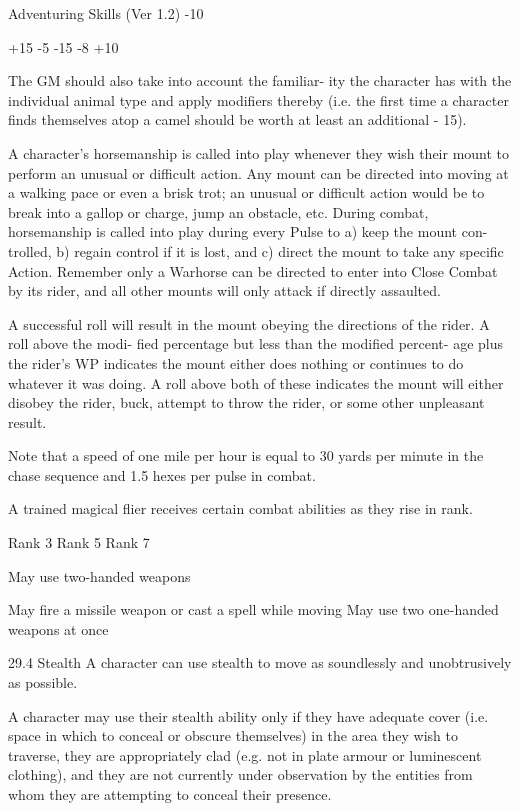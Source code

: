 \begin{Chapter}{Adventuring Skills (Ver 1.2)}
-10 

+15 
-5 
-15 
-8 
+10 
 

The GM should also take into account the familiar-
ity  the  character  has  with  the  individual  animal 
type and apply modifiers thereby (i.e. the first time 
a  character  finds  themselves  atop  a  camel  should 
be worth at least an additional - 15). 

A  character’s  horsemanship  is  called  into  play 
whenever  they  wish  their  mount  to  perform  an 
unusual  or  difficult  action.  Any  mount  can  be 
directed  into  moving  at  a  walking  pace  or  even  a 
brisk  trot;  an  unusual  or  difficult  action  would  be 
to break into a gallop or charge, jump an obstacle, 
etc.  During  combat,  horsemanship  is  called  into 
play during every Pulse to a) keep the mount con-
trolled,  b)  regain  control  if  it  is  lost,  and  c)  direct 
the  mount  to  take  any  specific  Action.  Remember 
only a Warhorse can be directed to enter into Close 
Combat by its rider, and all other mounts will only 
attack if directly assaulted. 

A  successful  roll  will  result  in  the  mount  obeying 
the  directions  of  the  rider.  A  roll  above  the  modi-
fied percentage but less than the modified percent-
age plus the rider’s WP indicates the mount either 
does  nothing  or  continues  to  do  whatever  it  was 
doing.  A  roll  above  both  of  these  indicates  the 
mount  will  either  disobey  the  rider,  buck,  attempt 
to throw the rider, or some other unpleasant result. 

Note  that a  speed  of  one  mile  per  hour  is  equal  to 
30 yards per minute in the chase sequence and 1.5 
hexes per pulse in combat. 

A  trained  magical  flier  receives  certain  combat 
abilities as they rise in rank. 

Rank 
3  
Rank 
5  
Rank 
7  

May use two-handed weapons 

May fire a missile weapon or cast a spell 
while moving 
May use two one-handed weapons at 
once 

29.4 Stealth 
A character can use stealth to move as soundlessly 
and unobtrusively as possible. 

A  character  may  use  their  stealth  ability  only  if 
they  have  adequate  cover  (i.e.  space  in  which  to 
conceal  or  obscure  themselves)  in  the  area  they 
wish  to  traverse,  they  are  appropriately  clad  (e.g. 
not  in  plate  armour  or  luminescent  clothing),  and 
they  are  not  currently  under  observation  by  the 
entities from whom they are attempting to conceal 
their presence. 


\end{Chapter}
